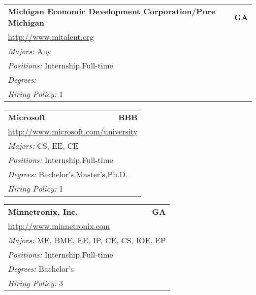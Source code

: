 \documentclass[twoside]{article}
\begin{document}
\begin{center}
\begin{multicols}{3}
\begin{FlushLeft}
\begin{minipage}{\columnwidth}
\end{minipage}
 
\begin{minipage}{\columnwidth}\begin{tabularx}{.95\columnwidth}{Xr}
                 {\Large\bf Michigan Economic Development Corporation/Pure Michigan} & {\Large\bf GA}\\
    \multicolumn{2}{p{.95\columnwidth}}{\url{http://www.mitalent.org}}\\
    \multicolumn{2}{p{.95\columnwidth}}{\emph{Majors:} Any}\\
    \multicolumn{2}{p{.95\columnwidth}}{\emph{Positions:} Internship,Full-time}\\
    \multicolumn{2}{p{.95\columnwidth}}{\emph{Degrees:} }\\
    \multicolumn{2}{p{.95\columnwidth}}{\emph{Hiring Policy:} 1}\\
    \end{tabularx}
    
\end{minipage}
 
\begin{minipage}{\columnwidth}\begin{tabularx}{.95\columnwidth}{Xr}
                 {\Large\bf Microsoft} & {\Large\bf BBB}\\
    \multicolumn{2}{p{.95\columnwidth}}{\url{http://www.microsoft.com/university}}\\
    \multicolumn{2}{p{.95\columnwidth}}{\emph{Majors:} CS, EE, CE}\\
    \multicolumn{2}{p{.95\columnwidth}}{\emph{Positions:} Internship,Full-time}\\
    \multicolumn{2}{p{.95\columnwidth}}{\emph{Degrees:} Bachelor's,Master's,Ph.D.}\\
    \multicolumn{2}{p{.95\columnwidth}}{\emph{Hiring Policy:} 1}\\
    \end{tabularx}
    
\end{minipage}
 
\begin{minipage}{\columnwidth}\begin{tabularx}{.95\columnwidth}{Xr}
                 {\Large\bf Minnetronix, Inc.} & {\Large\bf GA}\\
    \multicolumn{2}{p{.95\columnwidth}}{\url{http://www.minnetronix.com}}\\
    \multicolumn{2}{p{.95\columnwidth}}{\emph{Majors:} ME, BME, EE, IP, CE, CS, IOE, EP}\\
    \multicolumn{2}{p{.95\columnwidth}}{\emph{Positions:} Internship,Full-time}\\
    \multicolumn{2}{p{.95\columnwidth}}{\emph{Degrees:} Bachelor's}\\
    \multicolumn{2}{p{.95\columnwidth}}{\emph{Hiring Policy:} 3}\\
    \end{tabularx}
    

\end{minipage}
\end{FlushLeft}
\end{multicols}
\end{center}
\end{document}
